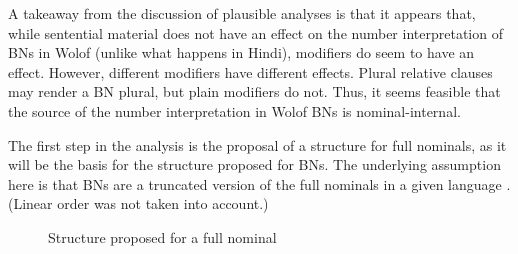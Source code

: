 \documentclass[output=paper]{langscibook}
\begin{document}
A takeaway from the discussion of plausible analyses is that it appears that, while sentential material does not have an effect on the number interpretation of BNs in Wolof (unlike what happens in Hindi), modifiers do seem to have an effect. However, different modifiers have different effects. Plural relative clauses may render a BN plural, but plain modifiers do not. Thus, it seems feasible that the source of the number interpretation in Wolof BNs is nominal-internal.
	
The first step in the analysis is the proposal of a structure for full nominals, as it will be the basis for the structure proposed for BNs. The underlying assumption here is that BNs are a truncated version of the full nominals in a given language \citep{massam2001pseudo}. (Linear order was not taken into account.)
	
	
\begin{figure}
\centering
{}
\caption{Structure proposed for a full nominal}
\label{fon:bzKTrEeEinDef}
\end{figure}
	
	
\end{document}
